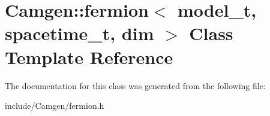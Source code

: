 \hypertarget{a00221}{}\section{Camgen\+:\+:fermion$<$ model\+\_\+t, spacetime\+\_\+t, dim $>$ Class Template Reference}
\label{a00221}


The documentation for this class was generated from the following file\+:\begin{DoxyCompactItemize}
\item 
include/\+Camgen/fermion.\+h\end{DoxyCompactItemize}
